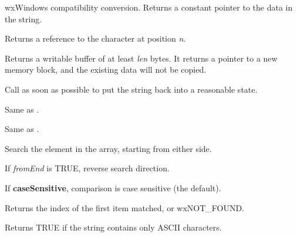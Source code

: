 wxWindows compatibility conversion. Returns a constant pointer to the data in the string.

\label{wxstringgetwritablechar}


Returns a reference to the character at position {\it n}.

\label{wxstringgetwritebuf}


Returns a writable buffer of at least {\it len} bytes.
It returns a pointer to a new memory block, and the
existing data will not be copied.

Call  as soon as possible
to put the string back into a reasonable state.

\label{wxstringindex}


Same as .


Same as .


Search the element in the array, starting from either side.

If {\it fromEnd} is TRUE, reverse search direction.

If {\bf caseSensitive}, comparison is case sensitive (the default).

Returns the index of the first item matched, or wxNOT\_FOUND.

%
%
\label{wxstringisascii}


Returns TRUE if the string contains only ASCII characters.

\label{wxstringisempty}


